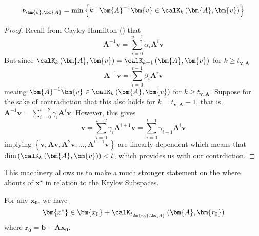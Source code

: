 \begin{cor} \label{theorem: grade_as_min}
    \[
        t_{\bm{v}, \bm{A}} = \min \left\{k \mid \bm{A}^{-1} \bm{v} \in \calK_{k} \left( \bm{A},\bm{v} \right) \right\}
    \]
\end{cor}
\begin{proof}
    Recall from Cayley-Hamilton () that
    \[
        \bm{A}^{-1} \bm{v} = \sum_{i=0}^{n-1} \alpha_{i} \bm{A}^{i} \bm{v}
    \]
    But since $\calK_{k} \left( \bm{A},\bm{v} \right) = \calK_{k+1} \left( \bm{A},\bm{v} \right)$ for $k \geq t_{\bm{v}, \bm{A}}$
    \[
        \bm{A}^{-1} \bm{v} = \sum_{i=0}^{t-1} \beta_{i} \bm{A}^{i} \bm{v}
    \]
    meaing $\bm{A}^{-1} \bm{v} \in \calK_{k} \left( \bm{A},\bm{v} \right)$ for $k \geq t_{\bm{v}, \bm{A}}$. Suppose for the sake of contradiction that this also holds for $k = t_{\bm{v}, \bm{A}} - 1$, that is, $\bm{A}^{-1} \bm{v} = \sum_{i=0}^{t-2} \gamma_{i} \bm{A}^{i} \bm{v}$. However, this gives
    \[
        \bm{v} = \sum_{i=0}^{t-2} \gamma_{i} \bm{A}^{i+1} \bm{v} = \sum_{i=0}^{t-1} \gamma_{i-1} \bm{A}^{i} \bm{v}
    \]
    implying $\left\{ \bm{v}, \bm{A} \bm{v}, \bm{A}^2 \bm{v}, \ldots , \bm{A}^{t-1} \bm{v} \right\}$ are linearly dependent which means that $\operatorname{dim} \left( \calK_{k} \left( \bm{A} , \bm{v} \right) \right) < t$, which provides us with our contrdiction.
\end{proof}
This machinery allows us to make a much stronger statement on the where abouts of $\bm{x^{\star}}$ in relation to the Krylov Subspaces.
\begin{cor} \label{theorem: sol_in_krylov}
    For any $\bm{x_0}$, we have
    \[
        \bm{x^{\star}} \in \bm{x_0} + \calK_{t_{\bm{r_0}, \bm{A}}} \left( \bm{A},\bm{r_0} \right)
    \]
    where $\bm{r_0} = \bm{b} - \bm{A} \bm{x_0}$.
\end{cor}